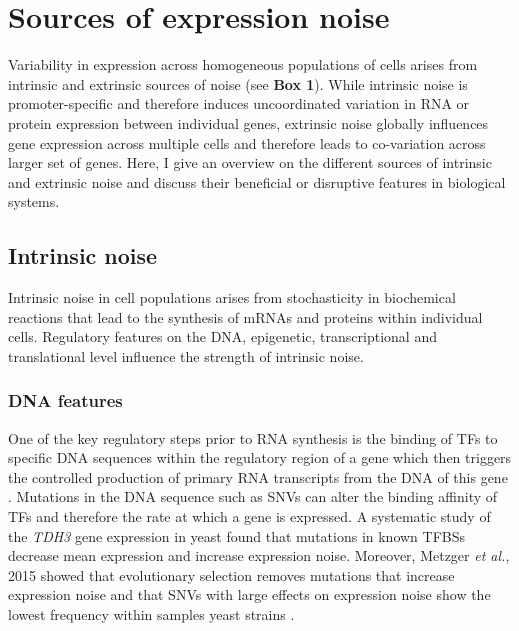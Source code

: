 
\section{Sources of expression noise} 

Variability in expression across homogeneous populations of cells arises from intrinsic and extrinsic sources of noise (see \textbf{Box 1}). While intrinsic noise is promoter-specific and therefore induces uncoordinated variation in RNA or protein expression between individual genes, extrinsic noise globally influences gene expression across multiple cells and therefore leads to co-variation across larger set of genes. Here, I give an overview on the different sources of intrinsic and extrinsic noise and discuss their beneficial or disruptive features in biological systems.

\subsection{Intrinsic noise}

Intrinsic noise in cell populations arises from stochasticity in biochemical reactions that lead to the synthesis of mRNAs and proteins within individual cells. Regulatory features on the DNA, epigenetic, transcriptional and translational level influence the strength of intrinsic noise.

\subsubsection{DNA features}

One of the key regulatory steps prior to RNA synthesis is the binding of \glspl{TF} to specific DNA sequences within the regulatory region of a gene which then triggers the controlled production of primary RNA transcripts from the DNA of this gene \citep{Latchman1993}. Mutations in the DNA sequence such as \glspl{SNV} can alter the binding affinity of TFs and therefore the rate at which a gene is expressed. A systematic study of the \textit{\Gls{TDH3}} gene expression in yeast found that mutations in known \glspl{TFBS} decrease mean expression and increase expression noise. Moreover, Metzger \textit{et al.}, 2015 showed that evolutionary selection removes mutations that increase expression noise and that SNVs with large effects on expression noise show the lowest frequency within samples yeast strains \citep{Metzger2015}. \\

